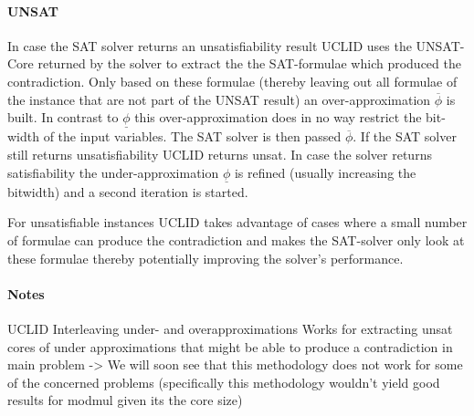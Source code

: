 \paragraph{UNSAT} In case the SAT solver returns an unsatisfiability result \textsc{UCLID} uses the UNSAT-Core returned by the solver to extract the the SAT-formulae which produced the contradiction. Only based on these formulae (thereby leaving out all formulae of the instance that are not part of the UNSAT result) an over-approximation $\overline{\phi}$ is built. In contrast to $\underline{\phi}$ this over-approximation does in no way restrict the bit-width of the input variables. The SAT solver is then passed $\overline{\phi}$. If the SAT solver still returns unsatisfiability \textsc{UCLID} returns unsat. In case the solver returns satisfiability the under-approximation $\underline{\phi}$ is refined (usually increasing the bitwidth) and a second iteration is started.
\par
For unsatisfiable instances \textsc{UCLID} takes advantage of cases where a small number of formulae can produce the contradiction and makes the SAT-solver only look at these formulae thereby potentially improving the solver's performance.

\paragraph{Notes}
UCLID
Interleaving under- and overapproximations
Works for extracting unsat cores of under approximations that might be able to produce a contradiction in main problem
-> We will soon see that this methodology does not work for some of the concerned problems (specifically this methodology wouldn't yield good results for modmul given its the core size)
